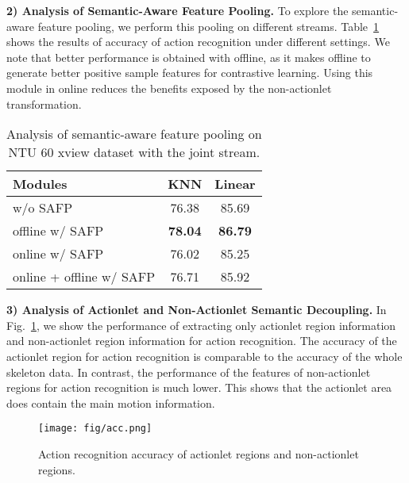 \documentclass[twocolumn]{article}
\begin{document}
\vspace{1mm}

\noindent\textbf{2) Analysis of Semantic-Aware Feature Pooling.} 
To explore the semantic-aware feature pooling, we perform this pooling on different streams. Table~\ref{tab:effi} shows the results of accuracy of action recognition under different settings. We note that better performance is obtained with offline, as it makes offline to generate better positive sample features for contrastive learning. Using this module in online reduces the benefits exposed by the non-actionlet transformation.


\begin{table}[tb]
    \small
    \begin{center}
    \caption{Analysis of semantic-aware feature pooling on NTU 60 xview dataset with the joint stream.}
    \label{tab:effi}
    \begin{tabular}{l|c|c}
    \toprule
Modules& KNN & Linear\\
    \midrule
    w/o SAFP & 76.38 & 85.69\\
offline w/ SAFP  & \textbf{78.04} & \textbf{86.79}\\
    online w/ SAFP & 76.02 & 85.25\\
    online + offline w/ SAFP & 76.71 & 85.92\\
    \bottomrule
    \end{tabular}
    \end{center}
    \vspace{-1em}
    \end{table}
    

\vspace{1mm}





\noindent\textbf{3) Analysis of Actionlet and Non-Actionlet Semantic Decoupling.}   
In Fig.~\ref{fig:acc}, we show the performance of extracting only actionlet region information and non-actionlet region information for action recognition. The accuracy of the actionlet region for action recognition is comparable to the accuracy of the whole skeleton data. In contrast, the performance of the features of non-actionlet regions for action recognition is much lower. This shows that the actionlet area does contain the main motion information. 

\begin{figure}[tb]
    \centering
    \texttt{[image: fig/acc.png]}
    \caption{
Action recognition accuracy of actionlet regions and non-actionlet regions. 
    }
    \label{fig:acc}
    \end{figure}
\end{document}
